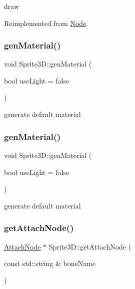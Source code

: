 draw 

Reimplemented from \hyperlink{classNode_abcf85087a15901deb7c6c1231634c8ab}{Node}.

\mbox{\label{classSprite3D_ac5fc3ddd4aef194a08a1a1285292b329}} 
\subsubsection{\texorpdfstring{gen\+Material()}{genMaterial()}\hspace{0.1cm}{\footnotesize\ttfamily [1/2]}}
{\footnotesize\ttfamily void Sprite3\+D\+::gen\+Material (\begin{DoxyParamCaption}\item[{bool}]{use\+Light = {\ttfamily false} }\end{DoxyParamCaption})}

generate default material \mbox{\label{classSprite3D_ac5fc3ddd4aef194a08a1a1285292b329}} 
\subsubsection{\texorpdfstring{gen\+Material()}{genMaterial()}\hspace{0.1cm}{\footnotesize\ttfamily [2/2]}}
{\footnotesize\ttfamily void Sprite3\+D\+::gen\+Material (\begin{DoxyParamCaption}\item[{bool}]{use\+Light = {\ttfamily false} }\end{DoxyParamCaption})}

generate default material \mbox{\label{classSprite3D_ad1b573c194312fc2ceccae106a18a881}} 
\subsubsection{\texorpdfstring{get\+Attach\+Node()}{getAttachNode()}\hspace{0.1cm}{\footnotesize\ttfamily [1/2]}}
{\footnotesize\ttfamily \hyperlink{classAttachNode}{Attach\+Node} $\ast$ Sprite3\+D\+::get\+Attach\+Node (\begin{DoxyParamCaption}\item[{const std\+::string \&}]{bone\+Name }\end{DoxyParamCaption})}

